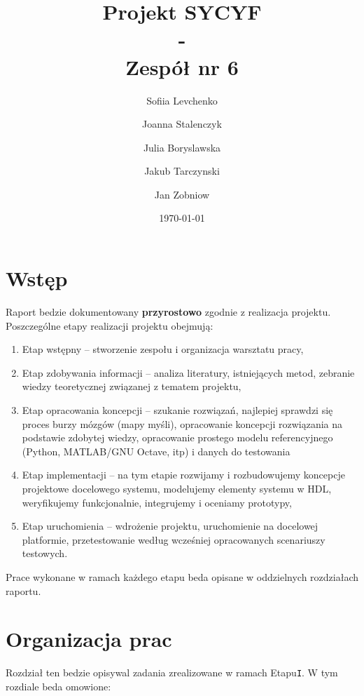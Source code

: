 \documentclass[a4paper,titleauthor]{mwart}
\title{{\Huge  Projekt SYCYF}\\ - \\{\Large Zespół nr 6}\\ }
\author{Sofiia Levchenko \and Joanna Stalenczyk \and Julia Boryslawska \and Jakub Tarczynski \and Jan Zobniow}
\date{\today}
\begin{document}
	
\maketitle
\tableofcontents

\section{Wstęp}
\label{sec:wstep}%

Raport bedzie dokumentowany \textbf{przyrostowo} zgodnie z realizacja projektu. Poszczególne etapy realizacji projektu obejmują: 

\renewcommand{\labelenumi}{\Roman{enumi}}
\begin{enumerate}\setlength{\itemsep}{0.2\baselineskip} 
	\item Etap wstępny – stworzenie zespołu i organizacja warsztatu pracy, 
	\item Etap zdobywania informacji – analiza literatury, istniejących metod, zebranie wiedzy teoretycznej związanej z tematem projektu, 
	\item Etap opracowania koncepcji – szukanie rozwiązań, najlepiej sprawdzi się proces burzy mózgów (mapy myśli), opracowanie koncepcji rozwiązania  na podstawie zdobytej wiedzy, opracowanie prostego modelu referencyjnego (Python, MATLAB/GNU Octave, itp) i danych do testowania  
	\item Etap implementacji – na tym etapie rozwijamy i rozbudowujemy koncepcje projektowe docelowego systemu, modelujemy elementy systemu w HDL, weryfikujemy funkcjonalnie, integrujemy i oceniamy prototypy, 
	\item Etap uruchomienia – wdrożenie projektu, uruchomienie na docelowej platformie, przetestowanie według wcześniej opracowanych scenariuszy testowych. 
\end{enumerate}

Prace wykonane w ramach każdego etapu beda opisane w oddzielnych rozdziałach raportu.

\section{Organizacja prac}
\label{sec:organizacja}

Rozdział ten bedzie opisywal zadania zrealizowane w ramach Etapu\texttt{I}. W tym rozdiale beda omowione:
\end{document}
